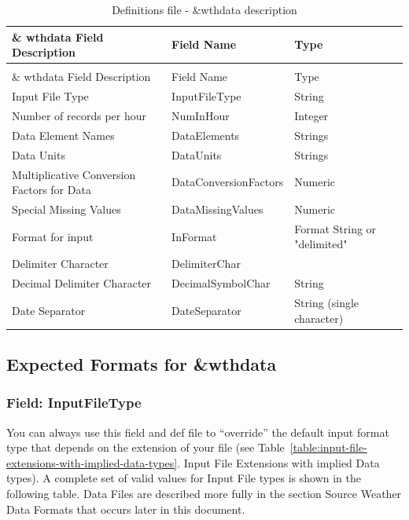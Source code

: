 \begin{longtable}[c]{p{2.71in}p{1.5in}p{1.79in}}
\caption{Definitions file - \&wthdata description \label{table:definitions-file-wthdata-description}} \tabularnewline
\toprule 
\& wthdata Field Description & Field Name & Type \tabularnewline
\midrule
\endfirsthead

\caption[]{Definitions file - \&wthdata description} \tabularnewline
\toprule 
\& wthdata Field Description & Field Name & Type \tabularnewline
\midrule
\endhead

Input File Type & InputFileType & String \tabularnewline
Number of records per hour & NumInHour & Integer \tabularnewline
Data Element Names & DataElements & Strings \tabularnewline
Data Units & DataUnits & Strings \tabularnewline
Multiplicative Conversion Factors for Data & DataConversionFactors & Numeric \tabularnewline
Special Missing Values & DataMissingValues & Numeric \tabularnewline
Format for input & InFormat & Format String or "delimited" \tabularnewline
Delimiter Character & DelimiterChar &  \tabularnewline
Decimal Delimiter Character & DecimalSymbolChar & String \tabularnewline
Date Separator & DateSeparator & String (single character) \tabularnewline
\bottomrule
\end{longtable}

\subsection{Expected Formats for \&wthdata}\label{expected-formats-for-wthdata}

\subsubsection{Field: InputFileType}\label{field-inputfiletype}

You can always use this field and def file to ``override'' the default input format type that depends on the extension of your file (see Table~\ref{table:input-file-extensions-with-implied-data-types}. Input File Extensions with implied Data types). A complete set of valid values for Input File types is shown in the following table. Data Files are described more fully in the section Source Weather Data Formats that occurs later in this document.

